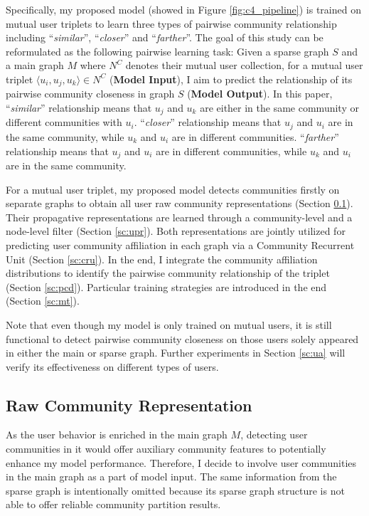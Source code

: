 Specifically, my proposed model (showed in Figure \ref{fig:c4_pipeline}) is trained on mutual user triplets to learn three types of pairwise community relationship including ``\textit{similar}'', ``\textit{closer}'' and ``\textit{farther}''. The goal of this study can be reformulated as the following pairwise learning task: Given a sparse graph $S$ and a main graph $M$ where $N^C$ denotes their mutual user collection, for a mutual user triplet $\langle u_i,u_j,u_k \rangle  \in N^C$ (\textbf{Model Input}),  I aim to predict the relationship of its pairwise community closeness in graph $S$ (\textbf{Model Output}). In this paper, ``\textit{similar}'' relationship means that $u_j$ and $u_k$ are either in the same community or different communities with $u_i$. ``\textit{closer}'' relationship means that $u_j$ and $u_i$ are in the same community, while $u_k$ and $u_i$ are in different communities. ``\textit{farther}'' relationship means that $u_j$ and $u_i$ are in different communities, while $u_k$ and $u_i$ are in the same community.

For a mutual user triplet, my proposed model detects communities firstly on separate graphs to obtain all user raw community representations (Section \ref{sc:rcr}). Their propagative representations are learned through a community-level and a node-level filter (Section \ref{sc:upr}). Both representations are jointly utilized for predicting user community affiliation in each graph via a Community Recurrent Unit (Section \ref{sc:cru}). In the end, I integrate the community affiliation distributions to identify the pairwise community relationship of the triplet (Section \ref{sc:pcd}). Particular training strategies are introduced in the end (Section \ref{sc:mt}).

Note that even though my model is only trained on mutual users, it is still functional to detect pairwise community closeness on those users solely appeared in either the main or sparse graph. Further experiments in Section \ref{sc:ua} will verify its effectiveness on different types of users.

\subsection{Raw Community Representation} \label{sc:rcr}

As the user behavior is enriched in the main graph $M$, detecting user communities in it would offer auxiliary community features to potentially enhance my model performance. Therefore, I decide to involve user communities in the main graph as a part of model input. The same information from the sparse graph is intentionally omitted because its sparse graph structure is not able to offer reliable community partition results.

